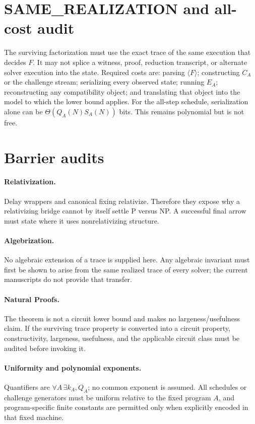 \documentclass[11pt]{article}
\begin{document}
\section*{SAME\_REALIZATION and all-cost audit}
The surviving factorization must use the exact trace of the same execution that
decides $F$.  It may not splice a witness, proof, reduction transcript, or
alternate solver execution into the state.  Required costs are: parsing
$\langle F\rangle$; constructing $C_A$ or the challenge stream; serializing
every observed state; running $E_A$; reconstructing any compatibility object;
and translating that object into the model to which the lower bound applies.
For the all-step schedule, serialization alone can be
$\Theta(Q_A(N)S_A(N))$ bits.  This remains polynomial but is not free.

\section*{Barrier audits}
\paragraph{Relativization.}
Delay wrappers and canonical fixing relativize.  Therefore they expose why a
relativizing bridge cannot by itself settle P versus NP.  A successful final
arrow must state where it uses nonrelativizing structure.

\paragraph{Algebrization.}
No algebraic extension of a trace is supplied here.  Any algebraic invariant
must first be shown to arise from the same realized trace of every solver; the
current manuscripts do not provide that transfer.

\paragraph{Natural Proofs.}
The theorem is not a circuit lower bound and makes no largeness/usefulness
claim.  If the surviving trace property is converted into a circuit property,
constructivity, largeness, usefulness, and the applicable circuit class must
be audited before invoking it.

\paragraph{Uniformity and polynomial exponents.}
Quantifiers are $\forall A\,\exists k_A,Q_A$; no common exponent is assumed.
All schedules or challenge generators must be uniform relative to the fixed
program $A$, and program-specific finite constants are permitted only when
explicitly encoded in that fixed machine.
\end{document}
